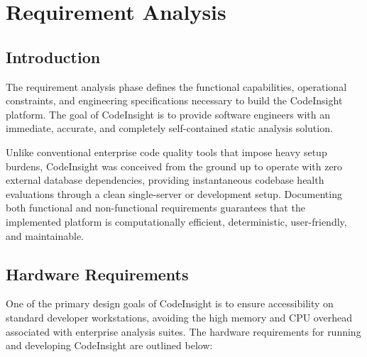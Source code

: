 \chapter{Requirement Analysis}

\section{Introduction}
The requirement analysis phase defines the functional capabilities, operational constraints, and engineering specifications necessary to build the CodeInsight platform. The goal of CodeInsight is to provide software engineers with an immediate, accurate, and completely self-contained static analysis solution. 

Unlike conventional enterprise code quality tools that impose heavy setup burdens, CodeInsight was conceived from the ground up to operate with zero external database dependencies, providing instantaneous codebase health evaluations through a clean single-server or development setup. Documenting both functional and non-functional requirements guarantees that the implemented platform is computationally efficient, deterministic, user-friendly, and maintainable.

\section{Hardware Requirements}
One of the primary design goals of CodeInsight is to ensure accessibility on standard developer workstations, avoiding the high memory and CPU overhead associated with enterprise analysis suites. The hardware requirements for running and developing CodeInsight are outlined below:

